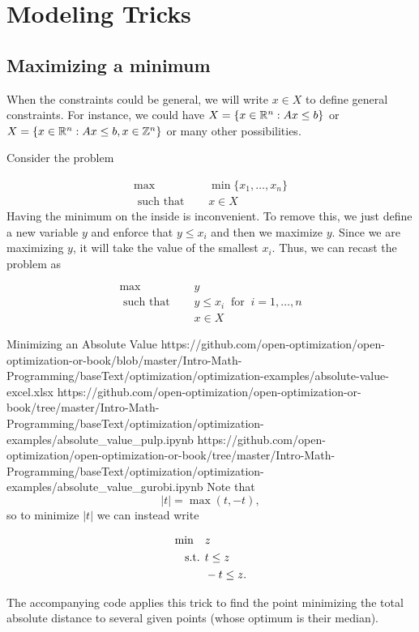 \section{Modeling Tricks}

\subsection{Maximizing a minimum}
When the constraints could be general, we will write $x \in X$ to define general constraints.  For instance, we could have $X = \{ x \in \mathbb{R}^n : Ax \leq b\}$ or $X  = \{ x \in \mathbb{R}^n : Ax \leq b, x \in \mathbb{Z}^n\}$ or many other possibilities.  

Consider the problem 

\begin{align*}
\max   \quad & \min \{x_1, \dots, x_n\}\\
\text{ such that } \quad &  x \in X
\end{align*}
Having the minimum on the inside is inconvenient.  To remove this, we just define a new variable $y$ and enforce that $y \leq x_i$ and then we maximize $y$.  Since we are maximizing $y$, it will take the value of the smallest $x_i$.  Thus, we can recast the problem as

\begin{align*}
\max\quad    & y\\
\text{ such that } \quad  & y \leq x_i \ \text{ for }\  i=1, \dots, n \\
&  x \in X
\end{align*}

\begin{examplewithallcode}{Minimizing an Absolute Value}
{https://github.com/open-optimization/open-optimization-or-book/blob/master/Intro-Math-Programming/baseText/optimization/optimization-examples/absolute-value-excel.xlsx}
{https://github.com/open-optimization/open-optimization-or-book/tree/master/Intro-Math-Programming/baseText/optimization/optimization-examples/absolute_value_pulp.ipynb}
{https://github.com/open-optimization/open-optimization-or-book/tree/master/Intro-Math-Programming/baseText/optimization/optimization-examples/absolute_value_gurobi.ipynb}
Note that
$$
|t| = \max(t, -t),
$$
so to minimize $|t|$ we can instead write

\begin{align*}
\min \quad & z\\
\text{ s.t. }        & t \leq z\\
           & -t \leq z.
\end{align*}

The accompanying code applies this trick to find the point minimizing the total
absolute distance to several given points (whose optimum is their median).
\end{examplewithallcode}

